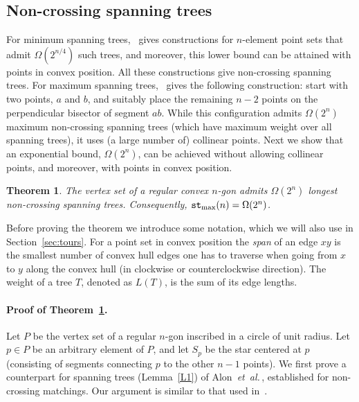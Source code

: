 \documentclass[11pt]{article}
\newtheorem{theorem}{Theorem}
\def\etal{{\it et~al.}\,}
\def\st{{\tt st}}
\begin{document}
\subsection {Non-crossing spanning trees}
For minimum spanning trees,~\cite{D02} gives constructions
for $n$-element point sets that admit
$\Omega(2^{n/4})$ such trees, and moreover, this lower bound
can be attained with points in convex position. All these
constructions give non-crossing spanning trees.
For maximum spanning trees,~\cite{D02} gives the following
construction: start with two points,
$a$ and $b$, and suitably place the remaining $n-2$ points on the
perpendicular bisector of segment $ab$. While this configuration
admits $\Omega(2^{n})$ maximum non-crossing spanning trees
(which have maximum weight over all spanning trees), it uses (a large number of)
collinear points. Next we show that an exponential bound, $\Omega(2^n)$, can be
achieved without allowing collinear points, and moreover, with points
in convex position.

\begin{theorem} \label{T3}
The vertex set of a regular convex $n$-gon admits
$\Omega(2^n)$ longest non-crossing spanning trees.
Consequently, $\st_{\rm max}(n)=\Omega(2^n)$.
\end{theorem}

Before proving the theorem we introduce some notation, which we will
also use in Section~\ref{sec:tours}.
For a point set in convex position the \emph{span} of an edge $xy$
is the smallest number of convex hull edges one has to traverse
when going from $x$ to $y$ along the convex hull (in clockwise or counterclockwise direction).
The weight of a tree $T$, denoted as $L(T)$, is the sum of its edge lengths.

\paragraph{Proof of Theorem~\ref{T3}.}
Let $P$ be the vertex set of a regular $n$-gon inscribed in a circle of unit radius.
Let $p\in P$ be an arbitrary element of $P$, and let $S_p$ be the star
centered at $p$ (consisting of segments connecting $p$ to the other
$n-1$ points). We first prove a counterpart for spanning trees (Lemma~\ref{L1})
of Alon~\etal\cite[Lemma 2.2]{ARS95}, established for non-crossing matchings.
Our argument is similar to that used in~\cite{ARS95}.
\end{document}
